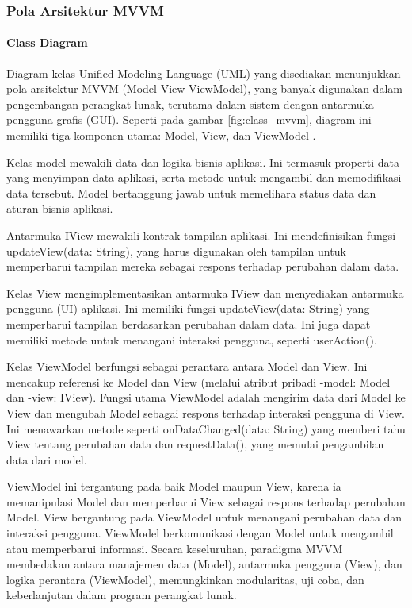 \documentclass[conference]{IEEEtran}
\begin{document}
	\subsubsection{Pola Arsitektur MVVM}
	\paragraph{Class Diagram}
	Diagram kelas Unified Modeling Language (UML) yang disediakan menunjukkan pola arsitektur MVVM (Model-View-ViewModel), yang banyak digunakan dalam pengembangan perangkat lunak, terutama dalam sistem dengan antarmuka pengguna grafis (GUI). Seperti pada gambar \ref{fig:class_mvvm}, diagram ini memiliki tiga komponen utama: Model, View, dan ViewModel \cite{ri2023}.
	
	Kelas model mewakili data dan logika bisnis aplikasi. Ini termasuk properti data yang menyimpan data aplikasi, serta metode untuk mengambil dan memodifikasi data tersebut. Model bertanggung jawab untuk memelihara status data dan aturan bisnis aplikasi.
	
	Antarmuka IView mewakili kontrak tampilan aplikasi. Ini mendefinisikan fungsi updateView(data: String), yang harus digunakan oleh tampilan untuk memperbarui tampilan mereka sebagai respons terhadap perubahan dalam data.
	
	Kelas View mengimplementasikan antarmuka IView dan menyediakan antarmuka pengguna (UI) aplikasi. Ini memiliki fungsi updateView(data: String) yang memperbarui tampilan berdasarkan perubahan dalam data. Ini juga dapat memiliki metode untuk menangani interaksi pengguna, seperti userAction().
	
	Kelas ViewModel berfungsi sebagai perantara antara Model dan View. Ini mencakup referensi ke Model dan View (melalui atribut pribadi -model: Model dan -view: IView). Fungsi utama ViewModel adalah mengirim data dari Model ke View dan mengubah Model sebagai respons terhadap interaksi pengguna di View. Ini menawarkan metode seperti onDataChanged(data: String) yang memberi tahu View tentang perubahan data dan requestData(), yang memulai pengambilan data dari model.
	
	ViewModel ini tergantung pada baik Model maupun View, karena ia memanipulasi Model dan memperbarui View sebagai respons terhadap perubahan Model. View bergantung pada ViewModel untuk menangani perubahan data dan interaksi pengguna. ViewModel berkomunikasi dengan Model untuk mengambil atau memperbarui informasi. Secara keseluruhan, paradigma MVVM membedakan antara manajemen data (Model), antarmuka pengguna (View), dan logika perantara (ViewModel), memungkinkan modularitas, uji coba, dan keberlanjutan dalam program perangkat lunak.
	
\end{document}
